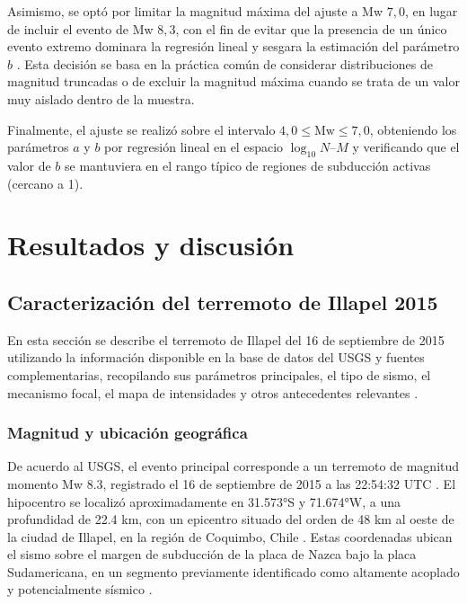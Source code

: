 \documentclass[a4paper,12pt]{article} %
\numberwithin{equation}{section} %
\numberwithin{figure}{section} %
\begin{document}
Asimismo, se optó por limitar la magnitud máxima del ajuste a Mw $7{,}0$, en lugar de incluir el evento de Mw $8{,}3$, con el fin de evitar que la presencia de un único evento extremo dominara la regresión lineal y sesgara la estimación del parámetro $b$ \cite{gutenberg_richter_1944,utsu_1995}. Esta decisión se basa en la práctica común de considerar distribuciones de magnitud truncadas o de excluir la magnitud máxima cuando se trata de un valor muy aislado dentro de la muestra.

Finalmente, el ajuste se realizó sobre el intervalo $4{,}0 \leq \mathrm{Mw} \leq 7{,}0$, obteniendo los parámetros $a$ y $b$ por regresión lineal en el espacio $\log_{10} N$--$M$ y verificando que el valor de $b$ se mantuviera en el rango típico de regiones de subducción activas (cercano a 1).

\newpage

\section{Resultados y discusión}
\subsection{Caracterización del terremoto de Illapel 2015}

En esta sección se describe el terremoto de Illapel del 16 de septiembre de 2015 utilizando la información disponible en la base de datos del USGS y fuentes complementarias, recopilando sus parámetros principales, el tipo de sismo, el mecanismo focal, el mapa de intensidades y otros antecedentes relevantes \cite{USGS_Illapel2015,USGS_ShakeMap_Illapel2015,Wikipedia_Illapel2015,Aranguiz_Geotech_Illapel2015,IRIS_SpecialEvent_Illapel2015,ITIC_Tsunami_Illapel2015,Ruiz_SeismicSequence_Illapel2016,Fernandez_Damage_Illapel2018,Klein_GPS_InSAR_Illapel2017}.

\subsubsection{Magnitud y ubicación geográfica}

De acuerdo al USGS, el evento principal corresponde a un terremoto de magnitud momento Mw 8.3, registrado el 16 de septiembre de 2015 a las 22:54:32 UTC \cite{USGS_Illapel2015}. El hipocentro se localizó aproximadamente en 31.573°S y 71.674°W, a una profundidad de 22.4 km, con un epicentro situado del orden de 48 km al oeste de la ciudad de Illapel, en la región de Coquimbo, Chile \cite{USGS_Illapel2015,IRIS_SpecialEvent_Illapel2015}. Estas coordenadas ubican el sismo sobre el margen de subducción de la placa de Nazca bajo la placa Sudamericana, en un segmento previamente identificado como altamente acoplado y potencialmente sísmico \cite{Aranguiz_Geotech_Illapel2015,Ruiz_SeismicSequence_Illapel2016}.
\end{document}
